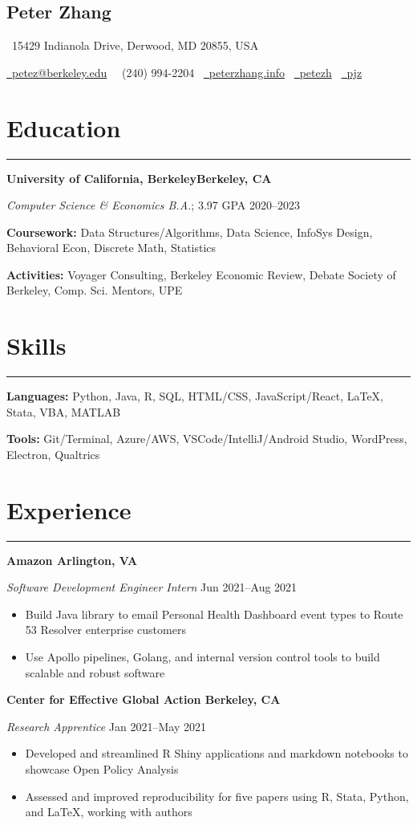 \documentclass[11pt]{article}
\newcommand{\name}[1]{\begin{center}\section*{\huge \color{highlight} #1}\vspace{-0.5cm}\end{center}}
\newcommand{\topinfo}[1]{\begin{center}\vspace{-0.2cm}#1\vspace{-0.2cm}\end{center}}
\newcommand{\resumesection}[1]{\vspace{-0.6cm}\section*{\color{highlight}#1}\vspace{-0.3cm}\hrule\vspace{0.2cm}}
\begin{document}
\name{Peter Zhang}
\topinfo{\faHome \ 15429 Indianola Drive, Derwood, MD 20855, USA}
\topinfo{\href{mailto:petez@berkeley.edu}{\faEnvelope \ petez@berkeley.edu} \ \faPhone \ (240) 994-2204 \ \href{https://peterzhang.info/}{\faBriefcase \ peterzhang.info} \  \href{https://github.com/petezh}{\faGithub \ petezh} \  \href{https://www.linkedin.com/in/pjz/}{\faLinkedinSquare \ pjz}}

\resumesection{Education}

\textbf{University of California, Berkeley\hfill Berkeley, CA} \par
\textit{Computer Science \& Economics B.A.}; 3.97 GPA \hfill 2020--2023\par
\textbf{Coursework:} Data Structures/Algorithms, Data Science, InfoSys Design, Behavioral Econ, Discrete Math, Statistics\par
\textbf{Activities:} Voyager Consulting, Berkeley Economic Review, Debate Society of Berkeley, Comp. Sci. Mentors, UPE

\resumesection{Skills}

\textbf{Languages:} Python, Java, R, SQL, HTML/CSS, JavaScript/React, \LaTeX, Stata, VBA, MATLAB \par
\textbf{Tools:} Git/Terminal, Azure/AWS, VSCode/IntelliJ/Android Studio, WordPress, Electron, Qualtrics
\resumesection{Experience}

\textbf{Amazon \hfill Arlington, VA}\par

\textit{Software Development Engineer Intern} \hfill Jun 2021--Aug 2021
\begin{itemize}
	\item Build Java library to email Personal Health Dashboard event types to Route 53 Resolver enterprise customers
	\item Use Apollo pipelines, Golang, and internal version control tools to build scalable and robust software
\end{itemize}\par

\textbf{Center for Effective Global Action \hfill Berkeley, CA}\par

\textit{Research Apprentice} \hfill Jan 2021--May 2021
\begin{itemize}
	\item Developed and streamlined R Shiny applications and markdown notebooks to showcase Open Policy Analysis
	\item Assessed and improved reproducibility for five papers using R, Stata, Python, and \LaTeX, working with authors
\end{itemize}\par
\end{document}
